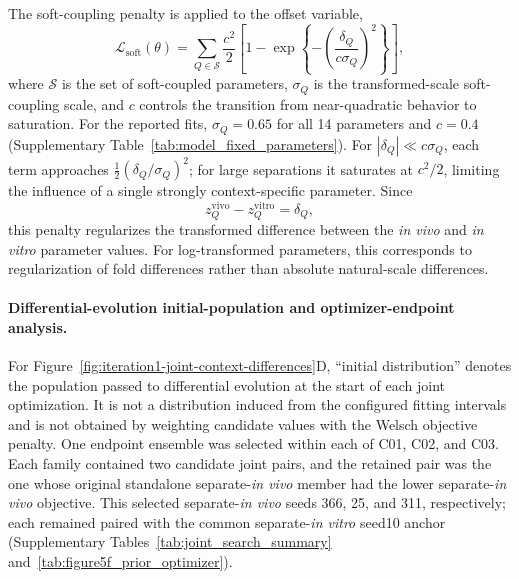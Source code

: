 \documentclass[11pt]{article}
\begin{document}
The soft-coupling penalty is applied to the offset variable,
\begin{equation}
\mathcal L_{\mathrm{soft}}(\theta)
=
\sum_{Q\in\mathcal S}
\frac{c^2}{2}
\left[
1-\exp\!\left\{
-\left(\frac{\delta_Q}{c\sigma_Q}\right)^2
\right\}
\right],
\label{eq:appendix_joint_soft_penalty}
\end{equation}
where $\mathcal S$ is the set of soft-coupled parameters, $\sigma_Q$ is the transformed-scale soft-coupling scale, and $c$ controls the transition from near-quadratic behavior to saturation. For the reported fits, $\sigma_Q=0.65$ for all 14 parameters and $c=0.4$ (Supplementary Table~\ref{tab:model_fixed_parameters}). For $|\delta_Q|\ll c\sigma_Q$, each term approaches $\tfrac{1}{2}(\delta_Q/\sigma_Q)^2$; for large separations it saturates at $c^2/2$, limiting the influence of a single strongly context-specific parameter. Since
\[
z_Q^{\mathrm{vivo}}-z_Q^{\mathrm{vitro}}=\delta_Q,
\]
this penalty regularizes the transformed difference between the \textit{in vivo} and \textit{in vitro} parameter values. For log-transformed parameters, this corresponds to regularization of fold differences rather than absolute natural-scale differences.

\paragraph{Differential-evolution initial-population and optimizer-endpoint analysis.}
For Figure~\ref{fig:iteration1-joint-context-differences}D, ``initial distribution'' denotes the population passed to differential evolution at the start of each joint optimization. It is not a distribution induced from the configured fitting intervals and is not obtained by weighting candidate values with the Welsch objective penalty. One endpoint ensemble was selected within each of C01, C02, and C03. Each family contained two candidate joint pairs, and the retained pair was the one whose original standalone separate-\textit{in vivo} member had the lower separate-\textit{in vivo} objective. This selected separate-\textit{in vivo} seeds 366, 25, and 311, respectively; each remained paired with the common separate-\textit{in vitro} seed10 anchor (Supplementary Tables~\ref{tab:joint_search_summary} and~\ref{tab:figure5f_prior_optimizer}).
\end{document}
